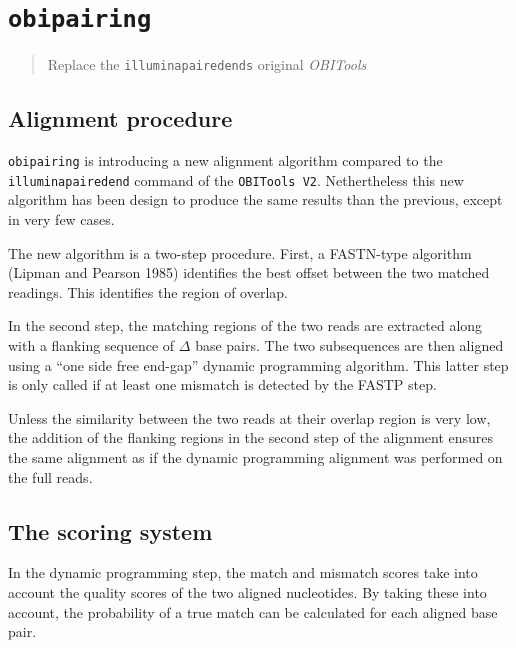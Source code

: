 \documentclass[
  letterpaper,
  DIV=11,
  numbers=noendperiod]{scrreprt}
\begin{document}
\hypertarget{obipairing}{%
\section{\texorpdfstring{\texttt{obipairing}}{obipairing}}\label{obipairing}}

\begin{quote}
Replace the \texttt{illuminapairedends} original \emph{OBITools}
\end{quote}

\hypertarget{alignment-procedure}{%
\subsection*{Alignment procedure}\label{alignment-procedure}}

\texttt{obipairing} is introducing a new alignment algorithm compared to
the \texttt{illuminapairedend} command of the \texttt{OBITools\ V2}.
Nethertheless this new algorithm has been design to produce the same
results than the previous, except in very few cases.

The new algorithm is a two-step procedure. First, a FASTN-type algorithm
(Lipman and Pearson 1985) identifies the best offset between the two
matched readings. This identifies the region of overlap.

In the second step, the matching regions of the two reads are extracted
along with a flanking sequence of \(\Delta\) base pairs. The two
subsequences are then aligned using a ``one side free end-gap'' dynamic
programming algorithm. This latter step is only called if at least one
mismatch is detected by the FASTP step.

Unless the similarity between the two reads at their overlap region is
very low, the addition of the flanking regions in the second step of the
alignment ensures the same alignment as if the dynamic programming
alignment was performed on the full reads.

\hypertarget{the-scoring-system}{%
\subsection*{The scoring system}\label{the-scoring-system}}

In the dynamic programming step, the match and mismatch scores take into
account the quality scores of the two aligned nucleotides. By taking
these into account, the probability of a true match can be calculated
for each aligned base pair.
\end{document}
